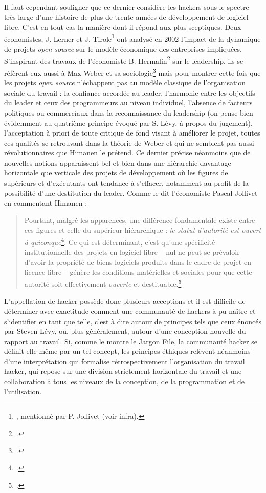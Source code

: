 \documentclass{FramateX}
\begin{document}
\begin{refsection}
Il faut cependant souligner que ce dernier considère les hackers sous le
spectre très large d'une histoire de plus de trente
années de développement de logiciel libre. C'est en
tout cas la manière dont il répond aux plus sceptiques. Deux
économistes, J. Lerner et J. Tirole\footnote{\cite{lernersimple2002}, mentionné par P. Jollivet (voir infra).} ont analysé en 2002 l'impact de la
dynamique de projets \textit{open source} sur le modèle économique des
entreprises impliquées. S'inspirant des travaux de
l'économiste B. Hermalin\footnote{\cite{hermalintowards1998}.} sur le
leadership, ils se réfèrent eux aussi à Max Weber et sa
sociologie\footnote{\cite{webereconomie1971}.}
mais pour montrer cette fois que les projets \textit{open source}
n'échappent pas au modèle classique de
l'organisation sociale du travail : la confiance
accordée au leader, l'harmonie entre les objectifs du
leader et ceux des programmeurs au niveau individuel,
l'absence de facteurs politiques ou commerciaux dans
la reconnaissance du leadership (on pense bien évidemment au quatrième
principe évoqué par S. Lévy, à propos du jugement),
l'acceptation à priori de toute critique de fond
visant à améliorer le projet, toutes ces qualités se retrouvant dans la
théorie de Weber et qui ne semblent pas aussi révolutionnaires que
Himanen le prétend. Ce dernier précise néanmoins que de nouvelles
notions apparaissent bel et bien dans une hiérarchie davantage
horizontale que verticale des projets de développement où les figures
de supérieurs et d'exécutants ont tendance à
s'effacer, notamment au profit de la possibilité
d'une destitution du leader. Comme le dit
l'économiste Pascal Jollivet en commentant Himanen :
\begin{quote}
Pourtant, malgré les apparences, une différence fondamentale existe
entre ces figures et celle du supérieur hiérarchique : \textit{le
statut d'autorité est ouvert à
quiconque}\footnote{\cite[p.~80]{himanenethique2001}.}. Ce qui est
déterminant, c'est qu'une spécificité
institutionnelle des projets en logiciel libre -- nul ne peut se
prévaloir d'avoir la propriété de biens logiciels
produits dans le cadre de projet en licence libre -- génère les
conditions matérielles et sociales pour que cette autorité soit
effectivement \textit{ouverte} et
destituable.\footnote{\cite[p.~165]{jollivetlethique2002}.}
\end{quote}
L'appellation de hacker possède donc plusieurs
acceptions et il est difficile de déterminer avec exactitude comment
une communauté de hackers à pu naître et s'identifier
en tant que telle, c'est à dire autour de principes
tels que ceux énoncés par Steven Lévy, ou, plus généralement, autour
d'une conception nouvelle du rapport au travail. Si,
comme le montre le Jargon File, la communauté hacker se définit elle
même par un tel concept, les principes éthiques relèvent néanmoins
d'une interprétation qui formalise rétrospectivement
l'organisation du travail hacker, qui repose sur une division
strictement horizontale du travail et une collaboration à tous les
niveaux de la conception, de la programmation et de l'utilisation.


\end{refsection}
\end{document}
